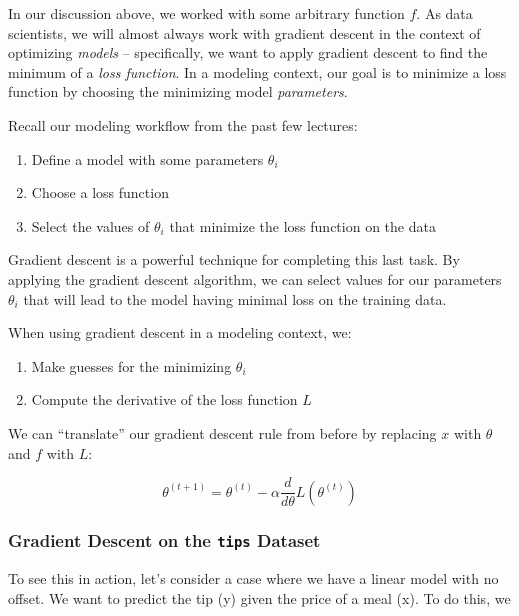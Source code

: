 \documentclass[
  letterpaper,
  DIV=11,
  numbers=noendperiod]{scrreprt}
\providecommand{\tightlist}{%
  \setlength{\itemsep}{0pt}\setlength{\parskip}{0pt}}\usepackage{longtable,booktabs,array}
\begin{document}
In our discussion above, we worked with some arbitrary function \(f\).
As data scientists, we will almost always work with gradient descent in
the context of optimizing \emph{models} -- specifically, we want to
apply gradient descent to find the minimum of a \emph{loss function}. In
a modeling context, our goal is to minimize a loss function by choosing
the minimizing model \emph{parameters}.

Recall our modeling workflow from the past few lectures:

\begin{enumerate}
\def\labelenumi{\arabic{enumi}.}
\tightlist
\item
  Define a model with some parameters \(\theta_i\)
\item
  Choose a loss function
\item
  Select the values of \(\theta_i\) that minimize the loss function on
  the data
\end{enumerate}

Gradient descent is a powerful technique for completing this last task.
By applying the gradient descent algorithm, we can select values for our
parameters \(\theta_i\) that will lead to the model having minimal loss
on the training data.

When using gradient descent in a modeling context, we:

\begin{enumerate}
\def\labelenumi{\arabic{enumi}.}
\tightlist
\item
  Make guesses for the minimizing \(\theta_i\)
\item
  Compute the derivative of the loss function \(L\)
\end{enumerate}

We can ``translate'' our gradient descent rule from before by replacing
\(x\) with \(\theta\) and \(f\) with \(L\):

\[\theta^{(t+1)} = \theta^{(t)} - \alpha \frac{d}{d\theta} L(\theta^{(t)})\]

\subsubsection{\texorpdfstring{Gradient Descent on the \texttt{tips}
Dataset}{Gradient Descent on the tips Dataset}}\label{gradient-descent-on-the-tips-dataset}

To see this in action, let's consider a case where we have a linear
model with no offset. We want to predict the tip (y) given the price of
a meal (x). To do this, we
\end{document}
